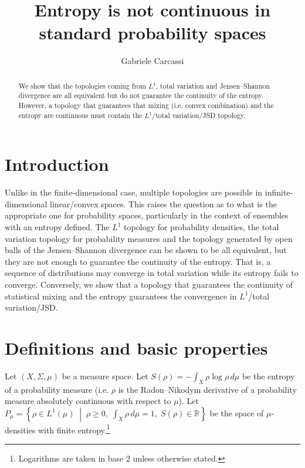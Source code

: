 \documentclass{techbrief}
\title{Entropy is not continuous in standard probability spaces}
\author{Gabriele Carcassi}
\begin{document}
	
	\maketitle
	
	\begin{abstract}
		We show that the topologies coming from $L^1$, total variation and Jensen--Shannon divergence are all equivalent but do not guarantee the continuity of the entropy. However, a topology that guarantees that mixing (i.e. convex combination) and the entropy are continuous must contain the $L^1$/total variation/JSD topology.
	\end{abstract}
	
	\section{Introduction}
	
	Unlike in the finite-dimensional case, multiple topologies are possible in infinite-dimensional linear/convex spaces. This raises the question as to what is the appropriate one for probability spaces, particularly in the context of ensembles with an entropy defined. The $L^1$ topology for probability densities, the total variation topology for probability measures and the topology generated by open balls of the Jensen--Shannon divergence can be shown to be all equivalent, but they are not enough to guarantee the continuity of the entropy. That is, a sequence of distributions may converge in total variation while its entropy fails to converge. Conversely, we show that a topology that guarantees the continuity of statistical mixing and the entropy guarantees the convergence in $L^1$/total variation/JSD.
	
	\section{Definitions and basic properties}
	
	Let $(X,\Sigma,\mu)$ be a measure space. Let $S(\rho) = -\int_X \rho \log \rho\,d\mu$ be the entropy of a probability measure (i.e. $\rho$ is the Radon--Nikodym derivative of a probability measure absolutely continuous with respect to $\mu$). Let $P_\mu = \left\{
	\rho \in L^1(\mu)
	\;\middle|\;
	\rho \geq 0,\;
	\int_X \rho\,d\mu = 1,\;
	S(\rho) \in \mathbb{R}
	\right\}$ be the space of $\mu$-densities with finite entropy.\footnote{Logarithms are taken in base $2$ unless otherwise stated.}
	
\end{document}
